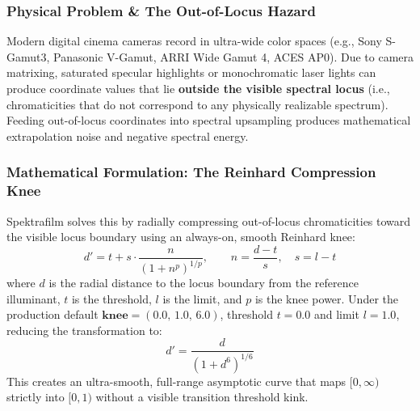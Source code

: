 \documentclass[11pt,a4paper]{article}
\begin{document}
\subsubsection{Physical Problem \& The Out-of-Locus Hazard}
Modern digital cinema cameras record in ultra-wide color spaces (e.g., Sony S-Gamut3, Panasonic V-Gamut, ARRI Wide Gamut 4, ACES AP0). Due to camera matrixing, saturated specular highlights or monochromatic laser lights can produce coordinate values that lie \textbf{outside the visible spectral locus} (i.e., chromaticities that do not correspond to any physically realizable spectrum). Feeding out-of-locus coordinates into spectral upsampling produces mathematical extrapolation noise and negative spectral energy.

\subsubsection{Mathematical Formulation: The Reinhard Compression Knee}
Spektrafilm solves this by radially compressing out-of-locus chromaticities toward the visible locus boundary using an always-on, smooth Reinhard knee:
\begin{equation}
d' = t + s \cdot \frac{n}{\left(1 + n^p\right)^{1/p}}, \qquad n = \frac{d - t}{s}, \quad s = l - t
\end{equation}
where $d$ is the radial distance to the locus boundary from the reference illuminant, $t$ is the threshold, $l$ is the limit, and $p$ is the knee power.
Under the production default $\mathbf{knee} = (0.0,\, 1.0,\, 6.0)$, threshold $t=0.0$ and limit $l=1.0$, reducing the transformation to:
\begin{equation}
d' = \frac{d}{\left(1 + d^6\right)^{1/6}}
\end{equation}
This creates an ultra-smooth, full-range asymptotic curve that maps $[0, \infty)$ strictly into $[0, 1)$ without a visible transition threshold kink.
\end{document}
